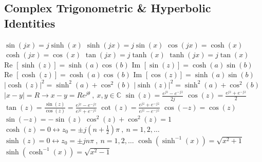 \documentclass[12pt]{article}
\def\Re{\text{Re\ }} %
\def\Im{\text{Im\ }} %
\begin{document}
\begin{flushleft}
	\subsection{Complex Trigonometric \& Hyperbolic Identities} 
	
	\textbullet \quad $\sin (jx) = j \sinh (x) $ \linebreak 
	\textbullet \quad $\sinh (jx) = j \sin (x) $ \linebreak 
	\textbullet \quad $\cos (jx) = \cosh (x) $ \linebreak 
	\textbullet \quad $\cosh (jx) = \cos (x) $ \linebreak 
	\textbullet \quad $\tan (jx) = j\tanh (x) $ \linebreak 
	\textbullet \quad $\tanh (jx) = j\tan (x) $ \linebreak 
	\textbullet \quad $\Re [ \sinh (z) ] = \sinh (a) \cos (b) $ \linebreak 
	\textbullet \quad $\Im [ \sin (z) ] = \cosh (a) \sin (b) $ \linebreak 
	\textbullet \quad $\Re [ \cosh (z) ] = \cosh (a) \cos (b) $ \linebreak 
	\textbullet \quad $\Im [ \cos (z) ] = \sinh (a) \sin (b) $ \linebreak 
	\textbullet \quad $|\cosh (z) |^2 = \sinh ^2(a) + \cos ^2 (b) $ \linebreak 
	\textbullet \quad $|\sinh (z)|^2 = \sinh ^2(a) + \cos ^2 (b) $ \linebreak 
	\textbullet \quad $|x-y| = R \rightarrow x-y = Re^{j\theta} \ , \ x,y \in \mathbb{C}$ \linebreak 
	\textbullet \quad $\sin (z) = \frac{e^{jz} -e^{-jz}}{2j} $ \linebreak 
	\textbullet \quad $\cos (z) = \frac{e^{jz} + e^{-jz}}{2}$ \linebreak 
	\textbullet \quad $\displaystyle \tan (z) = \frac{\sin (z)}{\cos (z)} = \frac{e^{jz} - e^{-jz}}{e^{jz} + e^{-jz}} $ \linebreak 
	\textbullet \quad $\displaystyle \cot (z) = \frac{e^{jz} + e^{-jz}}{e^{jz} -e^{-jz}} $ \linebreak 
	\textbullet \quad $\cos (-z) = \cos (z) $ \linebreak 
	\textbullet \quad $\sin (-z) = - \sin (z) $ \linebreak 
	\textbullet \quad $\cos ^2(z) + \cos ^2 (z) = 1 $ \linebreak 
	\textbullet \quad $\cosh (z) = 0 \leftrightarrow z_0 = \pm j \left(n + \frac{1}{2} \right)\pi \ , \ n = 1,2, \ldots $ \linebreak 
	\textbullet \quad $\sinh (z) = 0 \leftrightarrow z_0 = \pm jn\pi \ , \ n=1,2,\ldots$ \linebreak 
	\textbullet \quad $\cosh \left(\sinh ^{-1} (x)\right) = \sqrt{x^2+1}$ \linebreak 
	\textbullet \quad $\sinh \left(\cosh ^{-1}(x)\right) = \sqrt{x^2-1} $ \linebreak 
	

\end{flushleft}
\end{document}
